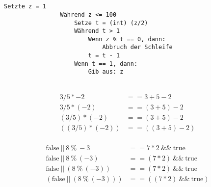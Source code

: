 \documentclass{article}
\begin{document}
    \uebungsblattTitel

    \section*{}
        \subsection{}
            \begin{lstlisting}[autogobble]
                Setzte z = 1
                Während z <= 100
                    Setze t = (int) (z/2)
                    Während t > 1
                        Wenn z % t == 0, dann:
                            Abbruch der Schleife
                        t = t - 1
                    Wenn t == 1, dann:
                        Gib aus: z
            \end{lstlisting}
        \subsection{}
            \begin{align}
                \begin{split}
                    3/5*-2&==3+5-2\\
                    3/5*(-2)&==(3+5)-2\\
                    (3/5)*(-2)&==(3+5)-2\\
                    ((3/5)*(-2))&==((3+5)-2)
                \end{split}
            \end{align}

            \begin{align}
                \begin{split}
                    \text{false}\ ||\ 8\ \%\ -3 &== 7 * 2\ \&\&\ \text{true}\\
                    \text{false}\ ||\ 8\ \%\ (-3) &== (7 * 2)\ \&\&\ \text{true}\\
                    \text{false}\ ||\ (8\ \%\ (-3)) &== (7 * 2)\ \&\&\ \text{true}\\
                    (\text{false}\ ||\ (8\ \%\ (-3))) &== ((7 * 2)\ \&\&\ \text{true})
                \end{split}
            \end{align}
\end{document}
